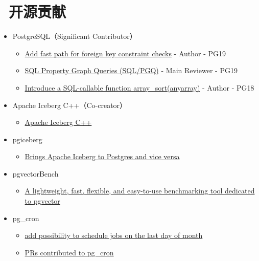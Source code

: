 \documentclass{resume}
\begin{document}
\section{\faCodeFork\ 开源贡献}
\begin{onehalfspacing}
  \begin{itemize}
    \item PostgreSQL（Significant Contributor）
      \begin{itemize}
        \item \href{https://git.postgresql.org/gitweb/?p=postgresql.git;a=commitdiff;h=2da86c1ef9b5446e0e22c0b6a5846293e58d98e3}{Add fast path for foreign key constraint checks} - Author - PG19
        \item \href{https://git.postgresql.org/gitweb/?p=postgresql.git;a=commitdiff;h=2f094e7ac691abc9d2fe0f4dcf0feac4a6ce1d9c}{SQL Property Graph Queries (SQL/PGQ)} - Main Reviewer - PG19
        \item \href{https://git.postgresql.org/gitweb/?p=postgresql.git;a=commitdiff;h=6c12ae09f5a5d6c153eaea7901542591dc28fb9e}{Introduce a SQL-callable function array\_sort(anyarray)} - Author - PG18
      \end{itemize}
    \item Apache Iceberg C++（Co-creator）
      \begin{itemize}
        \item \href{https://github.com/apache/iceberg-cpp}{Apache Iceberg C++}
      \end{itemize}
    \item pgiceberg
      \begin{itemize}
        \item \href{https://github.com/pgiceberg/pgiceberg}{Brings Apache Iceberg to Postgres and vice versa}
      \end{itemize}
    \item pgvectorBench
      \begin{itemize}
        \item \href{https://github.com/zhjwpku/pgvectorBench}{A lightweight, fast, flexible, and easy-to-use benchmarking tool dedicated to pgvector}
      \end{itemize}
    \item pg\_cron
      \begin{itemize}
        \item \href{https://github.com/citusdata/pg_cron/pull/273}{add possibility to schedule jobs on the last day of month}
        \item \href{https://github.com/citusdata/pg_cron/pulls?q=is%3Apr+author%3A%40me+}{PRs contributed to pg\_cron}
      \end{itemize}
  \end{itemize}
  \end{onehalfspacing}
\end{document}
